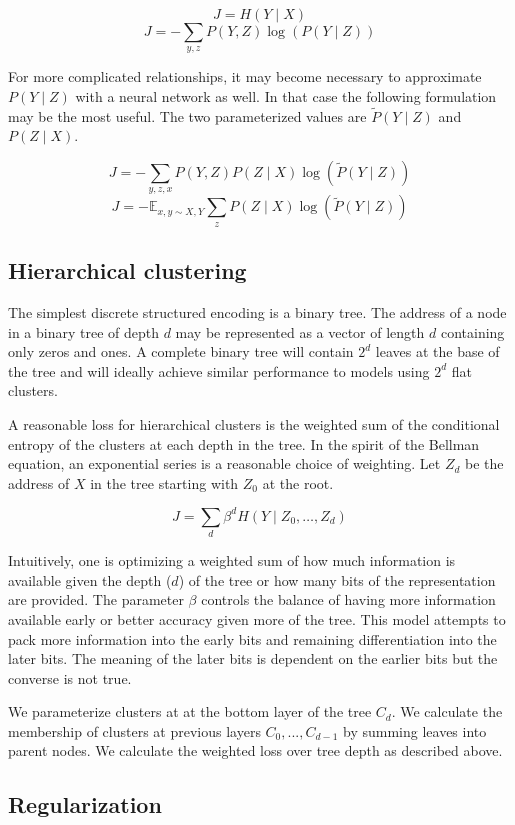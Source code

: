 \documentclass[11pt,letterpaper]{article}
\begin{document}
$$ J = H(Y \mid X) $$
$$ J = - \sum_{y,z} P(Y, Z) \log( P(Y \mid Z)) $$

For more complicated relationships, it may become necessary to approximate $P(Y \mid Z)$ with a neural network as well. In that case the following formulation may be the most useful. The two parameterized values are $\tilde{P}(Y \mid Z)$ and $P(Z \mid X)$.

$$ J = - \sum_{y,z,x} P(Y, Z) P(Z \mid X) \log( \tilde{P}(Y \mid Z)) $$
$$ J = - \mathbb{E}_{x,y \sim X, Y} \sum_{z} P(Z \mid X) \log( \tilde{P}(Y \mid Z)) $$

\subsection{Hierarchical clustering}

The simplest discrete structured encoding is a binary tree. The address of a node in a binary tree of depth $d$ may be represented as a vector of length $d$ containing only zeros and ones. A complete binary tree will contain $2^d$ leaves at the base of the tree and will ideally achieve similar performance to models using $2^d$ flat clusters.

A reasonable loss for hierarchical clusters is the weighted sum of the conditional entropy of the clusters at each depth in the tree. In the spirit of the Bellman equation, an exponential series is a reasonable choice of weighting. Let $Z_d$ be the address of $X$ in the tree starting with $Z_0$ at the root.

$$ J = \sum_d \beta ^ d  H(Y \mid Z_0,\ldots, Z_d) $$

Intuitively, one is optimizing a weighted sum of how much information is available given the depth ($d$) of the tree or how many bits of the representation are provided. The parameter $\beta$ controls the balance of having more information available early or better accuracy given more of the tree. This model attempts to pack more information into the early bits and remaining differentiation into the later bits. The meaning of the later bits is dependent on the earlier bits but the converse is not true.

We parameterize clusters at at the bottom layer of the tree $C_d$. We calculate the membership of clusters at previous layers $C_0,...,C_{d-1}$ by summing leaves into parent nodes. We calculate the weighted loss over tree depth as described above.

\subsection{Regularization}
\end{document}
